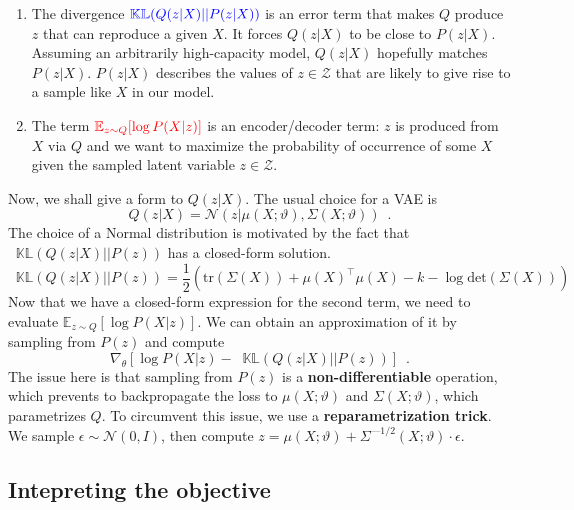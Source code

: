 \documentclass[12pt]{article}
\newcommand*\KL{\mathop{}\!\mathbb{KL}}
\begin{document}
%
\begin{enumerate}
    \item The divergence $\textcolor{blue}{\KL(Q(z \vert X) \vert\vert P(z \vert X))}$ is an error term that makes $Q$ produce $z$ that can reproduce a given $X$.
    It forces $Q(z \vert X)$ to be close to $P(z \vert X)$.
    Assuming an arbitrarily high-capacity model, $Q(z \vert X)$ hopefully matches $P(z \vert X)$.
    $P(z \vert X)$ describes the values of $z \in \mathcal{Z}$ that are likely to give rise to a sample like $X$ in our model.

    \item The term $\textcolor{red}{\mathbb{E}_{z \sim Q}[\log P(X \vert z)]}$ is an encoder/decoder term: $z$ is produced from $X$ via $Q$ and we want to maximize the probability of occurrence of some $X$ given the sampled latent variable $z \in \mathcal{Z}$.
\end{enumerate}
%
Now, we shall give a form to $Q(z \vert X)$.
The usual choice for a VAE is
%
\begin{equation}
    Q(z \vert X) = \mathcal{N}(z \vert \mu(X; \vartheta), \Sigma(X; \vartheta))
    \enspace .
\end{equation}
%
The choice of a Normal distribution is motivated by the fact that $\KL(Q(z \vert X) \vert\vert P(z))$ has a closed-form solution.
%
\begin{equation}
    \KL(Q(z \vert X) \vert\vert P(z)) =
    \frac{1}{2} \left(\mathrm{tr}(\Sigma(X))
    + \mu(X)^{\top}\mu(X)
    - k
    - \log \mathrm{det}(\Sigma(X))
    \right)
\end{equation}
%
Now that we have a closed-form expression for the second term, we need to evaluate $\mathbb{E}_{z \sim Q}[\log P(X \vert z)]$.
We can obtain an approximation of it by sampling from $P(z)$ and compute
%
\begin{equation}
    \nabla_{\theta}
    \left[
        \log P(X \vert z)
        - \KL(Q(z \vert X) \vert\vert P(z))
    \right]
    \enspace .
\end{equation}
%
The issue here is that sampling from $P(z)$ is a \textbf{non-differentiable} operation, which prevents to backpropagate the loss to $\mu(X;\vartheta)$ and $\Sigma(X;\vartheta)$, which parametrizes $Q$.
To circumvent this issue, we use a \textbf{reparametrization trick}. We sample $\epsilon \sim \mathcal{N}(0, I)$, then compute $z = \mu(X;\vartheta) + \Sigma^{—1/2}(X;\vartheta) \cdot \epsilon$.

\subsection{Intepreting the objective}
\end{document}
